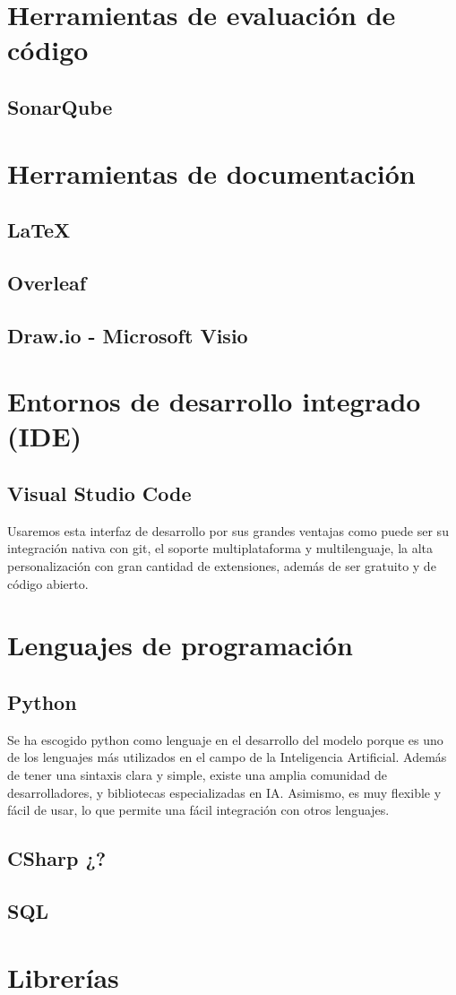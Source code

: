 \section{Herramientas de evaluación de código}

\subsection{SonarQube}

\section{Herramientas de documentación}

\subsection{\LaTeX}

\subsection{Overleaf}

\subsection{Draw.io - Microsoft Visio}

\section{Entornos de desarrollo integrado (IDE)}

\subsection{Visual Studio Code}
Usaremos esta interfaz de desarrollo por sus grandes ventajas como puede ser su integración nativa con git, el soporte multiplataforma y multilenguaje, la alta personalización con gran cantidad de extensiones, además de ser gratuito y de código abierto.

\section{Lenguajes de programación}

\subsection{Python}
Se ha escogido python como lenguaje en el desarrollo del modelo porque es uno de los lenguajes más utilizados en el campo de la Inteligencia Artificial. Además de tener una sintaxis clara y simple, existe una amplia comunidad de desarrolladores, y bibliotecas especializadas en IA. Asimismo, es muy flexible y fácil de usar, lo que permite una fácil integración con otros lenguajes.

\subsection{CSharp ¿?}

\subsection{SQL}

\section{Librerías}


